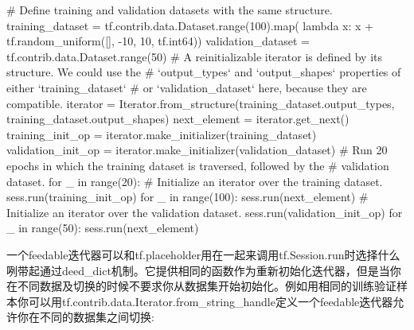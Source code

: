 \begin{python}
# Define training and validation datasets with the same structure.
training_dataset = tf.contrib.data.Dataset.range(100).map(
    lambda x: x + tf.random_uniform([], -10, 10, tf.int64))
validation_dataset = tf.contrib.data.Dataset.range(50)
# A reinitializable iterator is defined by its structure. We could use the
# `output\_types` and `output\_shapes` properties of either `training\_dataset`
# or `validation\_dataset` here, because they are compatible.
iterator = Iterator.from_structure(training_dataset.output_types,
training_dataset.output_shapes)
next_element = iterator.get_next()
training_init_op = iterator.make_initializer(training_dataset)
validation_init_op = iterator.make_initializer(validation_dataset)
# Run 20 epochs in which the training dataset is traversed, followed by the
# validation dataset.
for _ in range(20):
# Initialize an iterator over the training dataset.
    sess.run(training_init_op)
    for _ in range(100):
        sess.run(next_element)
    # Initialize an iterator over the validation dataset.
    sess.run(validation_init_op)
    for _ in range(50):
        sess.run(next_element)
\end{python}
一个feedable迭代器可以和tf.placeholder用在一起来调用tf.Session.run时选择什么咧带起通过deed\_dict机制。它提供相同的函数作为重新初始化迭代器，但是当你在不同数据及切换的时候不要求你从数据集开始初始化。例如用相同的训练验证样本你可以用tf.contrib.data.Iterator.from\_string\_handle定义一个feedable迭代器允许你在不同的数据集之间切换:
